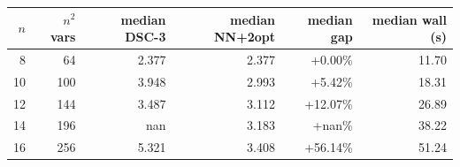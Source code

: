\begin{tabular}{rrrrrr}
\toprule
$n$ & $n^2$ vars & median DSC-3 & median NN+2opt & median gap & median wall (s) \\
\midrule
8 & 64 & 2.377 & 2.377 & +0.00\% & 11.70 \\
10 & 100 & 3.948 & 2.993 & +5.42\% & 18.31 \\
12 & 144 & 3.487 & 3.112 & +12.07\% & 26.89 \\
14 & 196 & nan & 3.183 & +nan\% & 38.22 \\
16 & 256 & 5.321 & 3.408 & +56.14\% & 51.24 \\
\bottomrule
\end{tabular}
